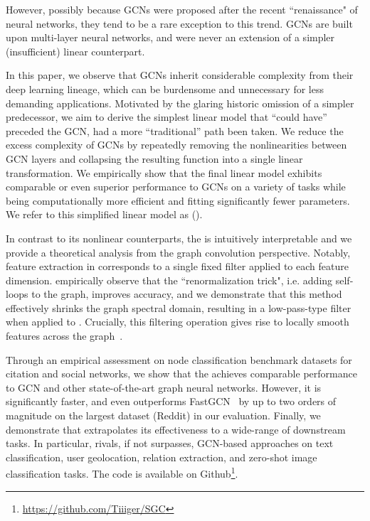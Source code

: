 However, possibly because GCNs were proposed after the recent ``renaissance" of neural networks, they tend to be a rare exception to this trend. GCNs are built upon multi-layer neural networks, and were never an extension of a simpler (insufficient) linear counterpart. 

In this paper, we observe that GCNs inherit considerable  complexity from their deep learning lineage, which can be burdensome and unnecessary for less demanding applications. Motivated by the glaring historic omission of a simpler predecessor, we aim to derive the simplest linear model that ``could have'' preceded the GCN, had a more ``traditional'' path been taken. We reduce the excess complexity of GCNs by repeatedly removing the nonlinearities between GCN layers and collapsing the resulting function into a single linear transformation. We empirically show that the final linear model exhibits comparable or even superior performance to GCNs on a variety of tasks while being computationally more efficient and fitting significantly fewer parameters. We refer to this simplified linear model as \Method{} (\method{}). 

In contrast to its nonlinear counterparts, the  \method{} is intuitively interpretable and 
we provide a theoretical analysis from the graph convolution perspective. 
Notably, feature extraction in \method{} corresponds to a single fixed filter applied to each feature dimension. 
\citet{gcn} empirically observe that the ``renormalization trick", i.e. adding self-loops to the graph, improves accuracy, and we demonstrate that this method effectively shrinks the graph spectral domain, resulting in a low-pass-type filter when applied to \method{}. 
Crucially, this filtering operation gives rise to locally smooth features across the graph~\cite{Bruna13}.

Through an empirical assessment on node classification benchmark datasets for citation and social networks, we show that the \method{} achieves comparable performance to GCN and other state-of-the-art graph neural networks. However, it is significantly faster, and even outperforms  FastGCN~\citep{FastGCN} by  up to two orders of magnitude on the largest dataset (Reddit) in our evaluation. 
Finally, we demonstrate that \method{} extrapolates its effectiveness to a wide-range of downstream tasks. In particular, \method{} rivals, if not surpasses, GCN-based approaches on text classification, user geolocation, relation extraction, and zero-shot image classification tasks. 
The code is available on Github\footnote{\url{https://github.com/Tiiiger/SGC}}.

